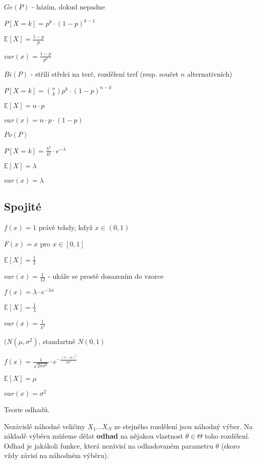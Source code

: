 \documentclass[a4paper,10pt,titlepage]{article} \usepackage[utf8]{inputenc}
\begin{document}
{}

$Ge(P)$ - házím, dokud nepadne

$P[X=k] = p^k \cdot (1-p)^{k-1}$

$\mathbb{E}[X] = \frac{1-p}{p}$

$var(x) = \frac{1-p}{p^2}$


{}

$Bi(P)$ - střílí střelci na terč, rozdělení tref (resp. součet $n$ alternativních)

$P[X=k] = \binom{n}{k} p^k \cdot (1-p)^{n-k}$

$\mathbb{E}[X] = n\cdot p$

$var(x) = n \cdot p \cdot (1-p)$

{}

$Po(P)$ 

$P[X=k] = \frac{\lambda ^k}{k!} \cdot e^{-\lambda}$

$\mathbb{E}[X] = \lambda$

$var(x) =\lambda$

\subsection{Spojité}

{}

$f(x) = 1$ právě tehdy, když $x \in (0,1)$

$F(x) = x$ pro $x \in [0,1]$

$\mathbb{E}[X] = \frac{1}{2}$

$var(x) = \frac{1}{12}$ - ukáže se prostě dosazením do vzorce

\medskip

{}

$f(x) = \lambda \cdot e^{-\lambda x}$

$\mathbb{E}[X] = \frac{1}{\lambda}$

$var(x) = \frac{1}{\lambda^2}$

{}
$(N(\mu , \sigma ^2)$, standartně $N(0,1)$

$f(x) = \frac{1}{\sqrt{2 \pi \sigma ^2}} \cdot e^{-\frac{(x-\mu )^2}{2 \sigma ^2}}$

$\mathbb{E}[X] = \mu$

$var(x) = \sigma ^2$

Teorie odhadů.

Nezávislé náhodné veličiny $X_1\ldots X_N$ ze stejného rozdělení jsou náhodný výber.
Na základě výběru můžeme dělat \textbf{odhad} na nějakou vlastnost
$\theta\in\Theta$ toho rozdělení. Odhad je jakákoli funkce, která nezávisí na
odhadovaném parametru $\theta$ (skoro vždy závisí na náhodném výběru).
\end{document}
